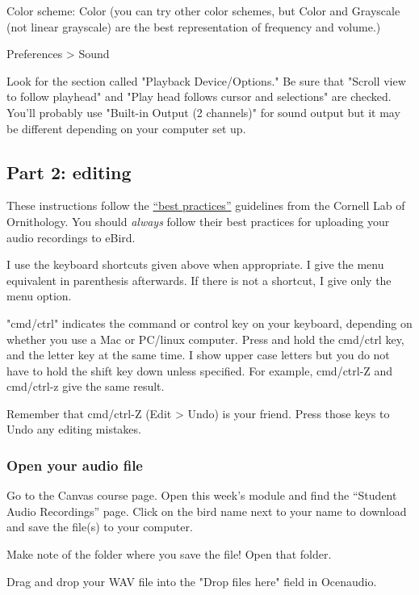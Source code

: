 \documentclass[12pt]{article}
\begin{document}
Color scheme: Color (you can try other color schemes, but Color and Grayscale (not linear grayscale) are the best representation of frequency and volume.)

\vspace{\baselineskip}

Preferences > Sound

Look for the section called "Playback Device/Options." Be sure that "Scroll view to follow playhead" and "Play head follows cursor and selections" are checked. You'll probably use "Built-in Output (2 channels)" for sound output but it may be different depending on your computer set up.



\subsection*{Part 2: editing}

These instructions follow the \href{https://support.ebird.org/en/support/solutions/articles/48001064341}{“best practices”} guidelines from the Cornell Lab of Ornithology. You should \emph{always} follow their best practices for uploading your audio recordings to eBird.


I use the keyboard shortcuts given above when appropriate. I give the menu equivalent in parenthesis afterwards. If there is not a shortcut, I give only the menu option.

"cmd/ctrl" indicates the command or control key on your keyboard, depending on whether you use a Mac or PC/linux computer. Press and hold the cmd/ctrl key, and the letter key at the same time. I show upper case letters but you do not have to hold the shift key down unless specified. For example, cmd/ctrl-Z and cmd/ctrl-z give the same result.


Remember that cmd/ctrl-Z (Edit > Undo) is your friend. Press those keys to Undo any editing mistakes.


\subsubsection*{Open your audio file}

Go to the Canvas course page. Open this week's module and find the “Student Audio Recordings” page. Click on the bird name next to your name to download and save the file(s) to your computer.

Make note of the folder where you save the file! Open that folder.


Drag and drop your WAV file into the "Drop files here" field in Ocenaudio.
\end{document}
